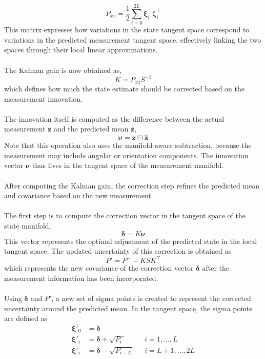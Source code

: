 $$
    P_{xz} = \frac{1}{2} \sum_{i=0}^{2L} \boldsymbol{\xi}_i^- \boldsymbol{\zeta}_i^\top
$$
This matrix expresses how variations in the state tangent space correspond to variations in the predicted measurement tangent space, effectively linking the two spaces through their local linear approximations.  
\\ \\
The Kalman gain is now obtained as,  
$$
    K = P_{xz} S^{-1}
$$
which defines how much the state estimate should be corrected based on the measurement innovation.  
\\ \\
The innovation itself is computed as the difference between the actual measurement $\mathbf{z}$ and the predicted mean $\hat{\mathbf{z}}$,  
$$
    \boldsymbol{\nu} = \mathbf{z} \boxminus \hat{\mathbf{z}}
$$
Note that this operation also uses the manifold-aware subtraction, because the measurement may include angular or orientation components. The innovation vector $\boldsymbol{\nu}$ thus lives in the tangent space of the measurement manifold.  
\\ \\
After computing the Kalman gain, the correction step refines the predicted mean and covariance based on the new measurement.  
\\ \\  
The first step is to compute the correction vector in the tangent space of the state manifold,
$$
    \boldsymbol{\delta} = K \boldsymbol{\nu}
$$
This vector represents the optimal adjustment of the predicted state in the local tangent space.  
The updated uncertainty of this correction is obtained as
$$
    P' = P^- - K S K^\top
$$
which represents the new covariance of the correction vector $\boldsymbol{\delta}$ after the measurement information has been incorporated.
\\ \\
Using $\boldsymbol{\delta}$ and $P'$, a new set of sigma points is created to represent the corrected uncertainty around the predicted mean.  
In the tangent space, the sigma points are defined as
\begin{equation}
    \begin{aligned}
        \boldsymbol{\xi}'_0 &= \boldsymbol{\delta} \\
        \boldsymbol{\xi}'_i &= \boldsymbol{\delta} + \sqrt{P_i^-}              && i = 1, \ldots, L \\
        \boldsymbol{\xi}'_i &= \boldsymbol{\delta} - \sqrt{P_{i - L}^-}       && i = L+1, \ldots, 2L
    \end{aligned}
\end{equation}
